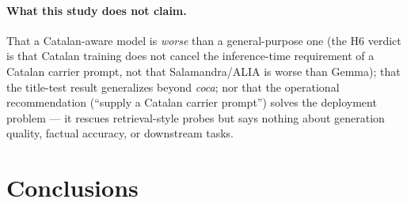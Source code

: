 \documentclass[10pt,twocolumn,a4paper]{article}
\newcommand{\concept}[1]{\emph{#1}}
\begin{document}
\paragraph{What this study does not claim.} That a Catalan-aware model is
\emph{worse} than a general-purpose one (the H6 verdict is that Catalan
training does not cancel the inference-time requirement of a Catalan carrier
prompt, not that Salamandra/ALIA is worse than Gemma); that the title-test
result generalizes beyond \concept{coca}; nor that the operational
recommendation (``supply a Catalan carrier prompt'') solves the deployment
problem --- it rescues retrieval-style probes but says nothing about
generation quality, factual accuracy, or downstream tasks.

\section{Conclusions}\label{sec:conclusions}
\end{document}

